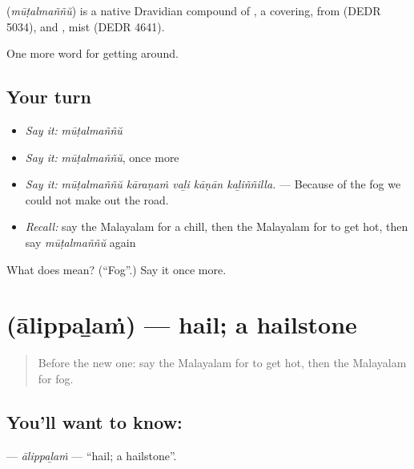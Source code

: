 \begin{cousinweb}
\textbf{} (\emph{mūṭalmaññŭ}) is a native Dravidian compound of , a covering, from  (DEDR 5034), and , mist (DEDR 4641).
\end{cousinweb}

\begin{grammarlens}[title={What you've built}]
One more word for getting around.
\end{grammarlens}

\subsection*{Your turn}
\begin{itemize}
\raggedright
  \item \emph{Say it:} \emph{mūṭalmaññŭ}
  \item \emph{Say it:} \emph{mūṭalmaññŭ}, once more
  \item \emph{Say it:} \emph{mūṭalmaññŭ kāraṇaṁ vaḻi kāṇān kaḻiññilla.} — Because of the fog we could not make out the road.
  \item \emph{Recall:} say the Malayalam for a chill, then the Malayalam for to get hot, then say \emph{mūṭalmaññŭ} again
\end{itemize}

\begin{tcolorbox}[breakable,colback=teal!4,colframe=teal!35!black,title={Before you move on}]
What does  mean? (\textquotedblleft{}Fog\textquotedblright{}.) Say it once more.
\end{tcolorbox}
\section[\texorpdfstring{\ml{ആലിപ്പഴം} (ālippaḻaṁ)}{ആലിപ്പഴം (ālippaḻaṁ)}]{ (ālippaḻaṁ) — hail; a hailstone}

\label{lesson:ML-C510-alippalam}



\begin{quote}
Before the new one: say the Malayalam for to get hot, then the Malayalam for fog.
\end{quote}

\subsection*{You'll want to know: }
\textbf{} — \emph{ālippaḻaṁ} — \textquotedblleft{}hail; a hailstone\textquotedblright{}.

